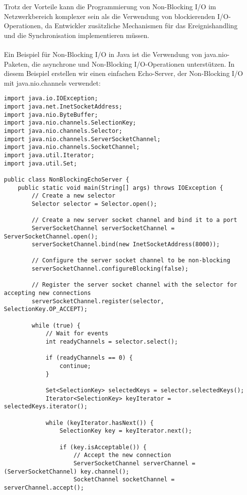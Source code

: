 Trotz der Vorteile kann die Programmierung von Non-Blocking I/O im Netzwerkbereich komplexer sein als die Verwendung von blockierenden I/O-Operationen, da Entwickler zusätzliche Mechanismen für das Ereignishandling und die Synchronisation implementieren müssen.
\\\\
Ein Beispiel für Non-Blocking I/O in Java ist die Verwendung von java.nio-Paketen, die asynchrone und Non-Blocking I/O-Operationen unterstützen. In diesem Beispiel erstellen wir einen einfachen Echo-Server, der Non-Blocking I/O mit java.nio.channels verwendet:
\newpage
\begin{lstlisting}[caption={Non-Blocking},captionpos=b,label={lst:nonb}]
import java.io.IOException;
import java.net.InetSocketAddress;
import java.nio.ByteBuffer;
import java.nio.channels.SelectionKey;
import java.nio.channels.Selector;
import java.nio.channels.ServerSocketChannel;
import java.nio.channels.SocketChannel;
import java.util.Iterator;
import java.util.Set;

public class NonBlockingEchoServer {
    public static void main(String[] args) throws IOException {
        // Create a new selector
        Selector selector = Selector.open();

        // Create a new server socket channel and bind it to a port
        ServerSocketChannel serverSocketChannel = ServerSocketChannel.open();
        serverSocketChannel.bind(new InetSocketAddress(8000));

        // Configure the server socket channel to be non-blocking
        serverSocketChannel.configureBlocking(false);

        // Register the server socket channel with the selector for accepting new connections
        serverSocketChannel.register(selector, SelectionKey.OP_ACCEPT);

        while (true) {
            // Wait for events
            int readyChannels = selector.select();

            if (readyChannels == 0) {
                continue;
            }

            Set<SelectionKey> selectedKeys = selector.selectedKeys();
            Iterator<SelectionKey> keyIterator = selectedKeys.iterator();

            while (keyIterator.hasNext()) {
                SelectionKey key = keyIterator.next();

                if (key.isAcceptable()) {
                    // Accept the new connection
                    ServerSocketChannel serverChannel = (ServerSocketChannel) key.channel();
                    SocketChannel socketChannel = serverChannel.accept();


\end{lstlisting}
